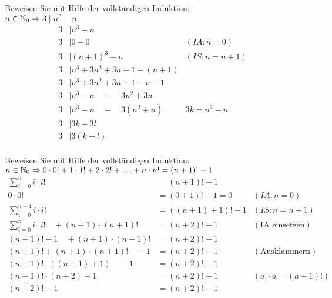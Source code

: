 \begin{card}
  Beweisen Sie mit Hilfe der vollständigen Induktion:\\
  $n \in \mathbb{N}_0 \Rightarrow 3 \mid n^3 - n$
  \hr
  \begin{align*}
    3 &\mid n^3 - n & \\
    3 &\mid 0 - 0 & (IA: n=0) \\
    3 &\mid (n+1)^3 - n & (IS: n=n+1) \\
    3 &\mid n^3 + 3n^2 + 3n + 1 - (n+1) & \\
    3 &\mid n^3 + 3n^2 + 3n + 1 - n - 1 & \\
    3 &\mid n^3 - n \quad + \quad 3n^2 + 3n & \\
    3 &\mid n^3 - n \quad + \quad 3(n^2 + n) & 3k = n^3 - n \\
    3 &\mid 3k + 3l & \\
    3 &\mid 3(k + l) & \\
  \end{align*}
\end{card}

\begin{card}
  Beweisen Sie mit Hilfe der vollständigen Induktion:\\
  $n \in \mathbb{N}_0 \Rightarrow 0 \cdot 0! + 1 \cdot 1! + 2 \cdot 2! + \ldots + n \cdot n! = (n+1)!-1$
  \hr
  \begin{align*}
    \sum\limits_{i=0}^{n} i \cdot i! &= (n+1)!-1 & \\
    0 \cdot 0! &= (0+1)!-1 = 0 & (IA: n=0) \\
    \sum\limits_{i=0}^{n+1} i \cdot i! &= ((n+1)+1)!-1 & (IS: n=n+1) \\
    \sum\limits_{i=0}^{n} i \cdot i! \quad + (n+1) \cdot (n+1)! &= (n+2)!-1 &  (\text{IA einsetzen})\\
    (n+1)! - 1 \quad + (n+1) \cdot (n+1)! &= (n+2)!-1 & \\
    (n+1)! + (n+1) \cdot (n+1)! \quad -1&= (n+2)!-1 & (\text{Ausklammern})\\
    (n+1)! \cdot ((n+1) +1) \quad -1&= (n+2)!-1 & \\
    (n+1)! \cdot (n+2) -1&= (n+2)!-1 & (a! \cdot a = (a+1)!)\\
    (n+2)! -1&= (n+2)!-1 & \\
  \end{align*}
\end{card}

